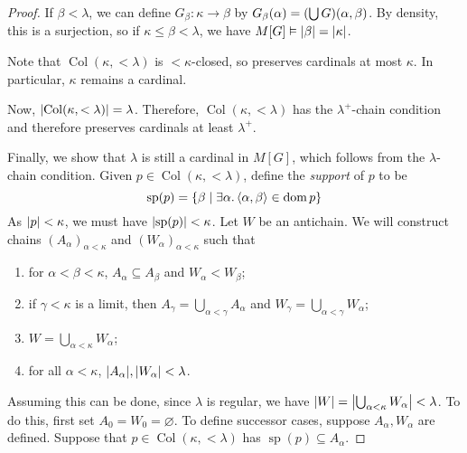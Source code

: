 \begin{proof}
    If \( \beta < \lambda \), we can define \( G_\beta : \kappa \to \beta \) by \( G_\beta(\alpha) = \qty(\bigcup G)(\alpha, \beta) \).
    By density, this is a surjection, so if \( \kappa \leq \beta < \lambda \), we have \( M[G] \vDash \abs{\beta} = \abs{\kappa} \).

    Note that \( \operatorname{Col}(\kappa, <\lambda) \) is \( <\kappa \)-closed, so preserves cardinals at most \( \kappa \).
    In particular, \( \kappa \) remains a cardinal.

    Now, \( \abs{\operatorname{Col}(\kappa, <\lambda)} = \lambda \).
    Therefore, \( \operatorname{Col}(\kappa, <\lambda) \) has the \( \lambda^+ \)-chain condition and therefore preserves cardinals at least \( \lambda^+ \).

    Finally, we show that \( \lambda \) is still a cardinal in \( M[G] \), which follows from the \( \lambda \)-chain condition.
    Given \( p \in \operatorname{Col}(\kappa, <\lambda) \), define the \emph{support} of \( p \) to be
    \[ \operatorname{sp}(p) = \qty{\beta \mid \exists\alpha.\, \langle \alpha, \beta \rangle \in \operatorname{dom}p} \]
    As \( \abs{p} < \kappa \), we must have \( \abs{\operatorname{sp}(p)} < \kappa \).
    Let \( W \) be an antichain.
    We will construct chains \( (A_\alpha)_{\alpha < \kappa} \) and \( (W_\alpha)_{\alpha < \kappa} \) such that
    \begin{enumerate}
        \item for \( \alpha < \beta < \kappa \), \( A_\alpha \subseteq A_\beta \) and \( W_\alpha < W_\beta \);
        \item if \( \gamma < \kappa \) is a limit, then \( A_\gamma = \bigcup_{\alpha < \gamma} A_\alpha \) and \( W_\gamma = \bigcup_{\alpha < \gamma} W_\alpha \);
        \item \( W = \bigcup_{\alpha < \kappa} W_\alpha \);
        \item for all \( \alpha < \kappa \), \( \abs{A_\alpha}, \abs{W_\alpha} < \lambda \).
    \end{enumerate}
    Assuming this can be done, since \( \lambda \) is regular, we have \( \abs{W} = \abs{\bigcup_{\alpha < \kappa} W_\alpha} < \lambda \).
    To do this, first set \( A_0 = W_0 = \varnothing \).
    To define successor cases, suppose \( A_\alpha, W_\alpha \) are defined.
    Suppose that \( p \in \operatorname{Col}(\kappa, <\lambda) \) has \( \operatorname{sp}(p) \subseteq A_\alpha \).

\end{proof}
